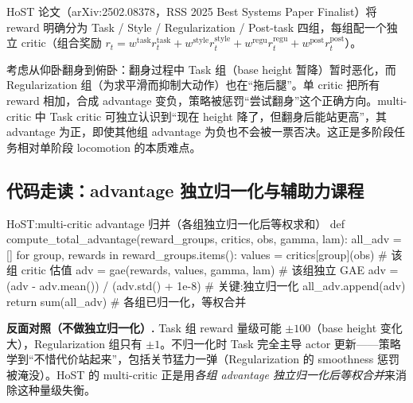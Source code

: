 HoST 论文（arXiv:2502.08378，RSS 2025 Best Systems Paper Finalist）将 reward 明确分为 Task / Style / Regularization / Post-task 四组，每组配一个独立 critic（组合奖励 $r_t=w^{\text{task}}r^{\text{task}}_t+w^{\text{style}}r^{\text{style}}_t+w^{\text{regu}}r^{\text{regu}}_t+w^{\text{post}}r^{\text{post}}_t$）。

\begin{insight}\label{ins:rlmc-hl-multicritic}
考虑从仰卧翻身到俯卧：翻身过程中 Task 组（base height 暂降）暂时恶化，而 Regularization 组（为求平滑而抑制大动作）也在“拖后腿”。单 critic 把所有 reward 相加，合成 advantage 变负，策略被惩罚“尝试翻身”这个正确方向。multi-critic 中 Task critic 可独立认识到“现在 height 降了，但翻身后能站更高”，其 advantage 为正，即使其他组 advantage 为负也不会被一票否决。这正是多阶段任务相对单阶段 locomotion 的本质难点。
\end{insight}

\subsection{代码走读：advantage 独立归一化与辅助力课程}

\begin{codebox}[Python]{HoST:multi-critic advantage 归并（各组独立归一化后等权求和）}
def compute_total_advantage(reward_groups, critics, obs, gamma, lam):
    all_adv = []
    for group, rewards in reward_groups.items():
        values = critics[group](obs)                 # 该组 critic 估值
        adv = gae(rewards, values, gamma, lam)        # 该组独立 GAE
        adv = (adv - adv.mean()) / (adv.std() + 1e-8) # 关键:独立归一化
        all_adv.append(adv)
    return sum(all_adv)                                # 各组已归一化，等权合并
\end{codebox}

\begin{note}
\textbf{反面对照（不做独立归一化）.}\;
Task 组 reward 量级可能 $\pm100$（base height 变化大），Regularization 组只有 $\pm1$。不归一化时 Task 完全主导 actor 更新——策略学到“不惜代价站起来”，包括关节猛力一弹（Regularization 的 smoothness 惩罚被淹没）。HoST 的 multi-critic 正是用\emph{各组 advantage 独立归一化后等权合并}来消除这种量级失衡。
\end{note}

